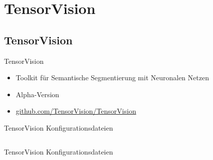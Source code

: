 \section{TensorVision}
\subsection{TensorVision}

\begin{frame}{TensorVision}
    \begin{itemize}
        \item Toolkit für Semantische Segmentierung mit Neuronalen Netzen
        \item Alpha-Version
        \item \href{https://github.com/TensorVision/TensorVision}{github.com/TensorVision/TensorVision}
    \end{itemize}
\end{frame}

\begin{frame}{TensorVision Konfigurationsdateien}
    \inputminted[linenos, numbersep=5pt, tabsize=4, frame=none, firstline=1,lastline=13]{json}{model-301.json}
\end{frame}


\begin{frame}{TensorVision Konfigurationsdateien}
    \inputminted[linenos, numbersep=5pt, tabsize=4, frame=none, firstline=18,lastline=32]{json}{model-301.json}
\end{frame}
